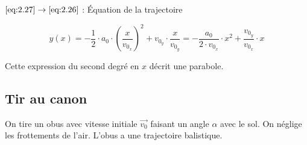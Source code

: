 \documentclass[
    11pt,
    a4paper,
    oneside,
    headinlcude, footinclude,
    twoside,
]{report}
\renewcommand{\vec}[1]{\overrightarrow{#1}}
\begin{document}
$\eqref{eq:2.27} \to \eqref{eq:2.26}$ : Équation de la trajectoire

\begin{equation}
\label{eq:2.28}
y (x) = -\frac{1}{2} \cdot a_{0} \cdot \left(\frac{x}{v_{0_{x}}}\right)^{2} +
v_{0_{y}} \cdot \frac{x}{v_{0_{y}}} = -\frac{a_{0}}{2 \cdot v_{0_{x}}}
\cdot x^{2} + \frac{v_{0_{y}}}{v_{0_{x}}} \cdot x
\end{equation}

Cette expression du second degré en $x$ décrit une parabole.

\subsection{Tir au canon}
\label{sub:tir_au_canon}

On tire un obus avec vitesse initiale $\vec{v_{0}}$ faisant un angle $\alpha$ avec
le sol. On néglige les frottements de l'air. L'obus a une trajectoire
balistique.
\end{document}
